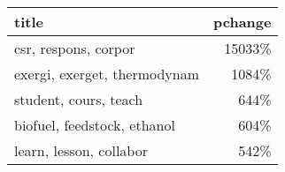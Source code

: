 \begin{tabular}{p{1.2cm}r}
\toprule
                        title &  pchange \\
\midrule
         csr, respons, corpor &   15033\% \\
 exergi, exerget, thermodynam &    1084\% \\
        student, cours, teach &     644\% \\
  biofuel, feedstock, ethanol &     604\% \\
      learn, lesson, collabor &     542\% \\
\bottomrule
\end{tabular}
